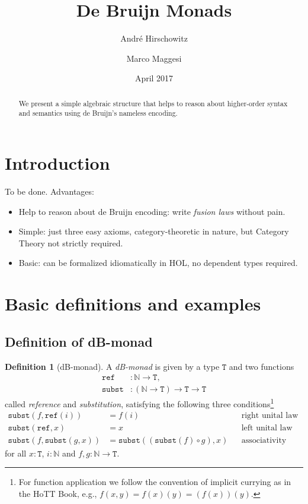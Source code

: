 \documentclass[a4paper,twoside,12pt]{article}
\title{De Bruijn Monads}
\author{Andr\'e Hirschowitz \and Marco Maggesi}
\date{April 2017}
\theoremstyle{definition}
\newtheorem{definition}{Definition}
\theoremstyle{remark}
\newcommand{\NN}{\mathbb{N}}
\newcommand{\subst}{\mathtt{subst}}
\newcommand{\refe}{\mathtt{ref}}
\newcommand{\TT}{\mathtt{T}}
\begin{document}
\maketitle

\begin{abstract}
  We present a simple algebraic structure that helps to reason about
  higher-order syntax and semantics using de Bruijn's nameless
  encoding.
\end{abstract}

\section{Introduction}
\label{sec:intro}
To be done.
Advantages:
\begin{itemize}
\item Help to reason about de Bruijn encoding: write \emph{fusion
    laws} without pain.
\item Simple: just three easy axioms, category-theoretic in nature,
  but Category Theory not strictly required.
\item Basic: can be formalized idiomatically in HOL, no dependent
  types required.
\end{itemize}

\section{Basic definitions and examples}
\label{sec:basic-def}

\subsection{Definition of dB-monad}
\label{sec:basic-defin-example}

\begin{definition}[dB-monad]
  A \emph{dB-monad} is given by a type $\TT$ and two functions
  \begin{align*}
    \refe &\colon \NN \to \TT, \\
    \subst &\colon (\NN \to \TT) \to \TT \to \TT
  \end{align*}
  called \emph{reference} and \emph{substitution}, satisfying the
  following three conditions\footnote{For function application we
    follow the convention of implicit currying as in the HoTT Book,
    e.g., $f(x,y) = f(x)(y) = (f(x))(y)$.}
  \begin{align*}
    \subst(f,\refe(i)) &=  f(i)
    && \text{right unital law} \\
    \subst(\refe, x) &=  x
    && \text{left unital law} \\
    \subst(f, \subst(g, x)) &= \subst((\subst(f) \circ g), x)
    &&\text{associativity law}
  \end{align*}
  for all $x : \TT$, $i :\NN$ and $f,g\colon \NN \to \TT$.
\end{definition}
\end{document}
